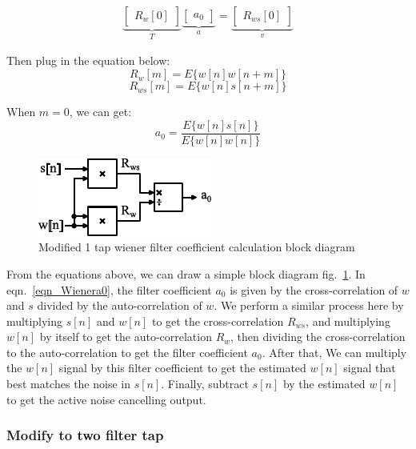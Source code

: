 \begin{gather}
\underbrace{
    \begin{bmatrix}
    R_w[0]
    \end{bmatrix}
}_{T}
\underbrace{
    \begin{bmatrix}
    a_0
    \end{bmatrix}
}_{a}
=
\underbrace{
    \begin{bmatrix}
    R_{ws}[0]
    \end{bmatrix}
}_{v}
\end{gather}

Then plug in the equation below:
$$R_w[m]=E\{w[n]w[n+m]\}$$
$$R_{ws}[m]=E\{w[n]s[n+m]\}$$

When $m=0$, we can get:
\begin{equation}
\label{eqn_Wienera0}
a_0 = \frac{E\{w[n]s[n]\}}{E\{w[n]w[n]\}}
\end{equation}

\begin{figure}[H]
\centerline{\includegraphics[width=0.5\linewidth]{4-ANC_Sys/ModifiedWiener.pdf}}
\caption{Modified 1 tap wiener filter coefficient calculation block diagram}
\label{fig_ModifiedWiener}
\end{figure}

From the equations above, we can draw a simple block diagram fig.~\ref{fig_ModifiedWiener}.  In eqn.~\ref{eqn_Wienera0}, the filter coefficient $a_0$ is given by the cross-correlation of $w$ and $s$ divided by the auto-correlation of $w$.  We perform a similar process here by multiplying $s[n]$ and $w[n]$ to get the cross-correlation $R_{ws}$, and multiplying $w[n]$ by itself to get the auto-correlation $R_w$, then dividing the cross-correlation to the auto-correlation to get the filter coefficient $a_0$.  After that, We can multiply the $w[n]$ signal by this filter coefficient to get the estimated $w[n]$ signal that best matches the noise in $s[n]$.  Finally, subtract $s[n]$ by the estimated $w[n]$ to get the active noise cancelling output.

\subsubsection{Modify to two filter tap}  

